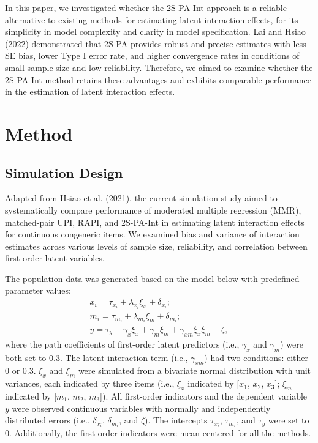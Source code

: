 \documentclass[
  man,mask]{apa6}
\begin{document}
In this paper, we investigated whether the 2S-PA-Int approach is a reliable alternative to existing methods for estimating latent interaction effects, for its simplicity in model complexity and clarity in model specification. Lai and Hsiao (2022) demonstrated that 2S-PA provides robust and precise estimates with less SE bias, lower Type I error rate, and higher convergence rates in conditions of small sample size and low reliability. Therefore, we aimed to examine whether the 2S-PA-Int method retains these advantages and exhibits comparable performance in the estimation of latent interaction effects.

\section{Method}\label{method}

\subsection{Simulation Design}\label{simulation-design}

Adapted from Hsiao et al. (2021), the current simulation study aimed to systematically compare performance of moderated multiple regression (MMR), matched-pair UPI, RAPI, and 2S-PA-Int in estimating latent interaction effects for continuous congeneric items. We examined bias and variance of interaction estimates across various levels of sample size, reliability, and correlation between first-order latent variables.

The population data was generated based on the model below with predefined parameter values:
\begin{equation}
\begin{gathered}
x_{i} =  \tau_{x_{i}} + \lambda_{x_{i}}\xi_{x} + \delta_{x_{i}};\\
m_{i} =  \tau_{m_{i}} + \lambda_{m_{i}}\xi_{m} + \delta_{m_{i}};\\
y =  \tau_{y} + \gamma_{x}\xi_{x} + \gamma_{m}\xi_{m} + \gamma_{xm}\xi_{x}\xi_{m} + \zeta,
\end{gathered}
\end{equation}
where the path coefficients of first-order latent predictors (i.e., \(\gamma_{x}\) and \(\gamma_{m}\)) were both set to 0.3. The latent interaction term (i.e., \(\gamma_{xm}\)) had two conditions: either 0 or 0.3. \(\xi_{x}\) and \(\xi_{m}\) were simulated from a bivariate normal distribution with unit variances, each indicated by three items (i.e., \(\xi_{x}\) indicated by {[}\(x_{1}\), \(x_{2}\), \(x_{3}\){]}; \(\xi_{m}\) indicated by {[}\(m_{1}\), \(m_{2}\), \(m_{3}\){]}). All first-order indicators and the dependent variable \(y\) were observed continuous variables with normally and independently distributed errors (i.e., \(\delta_{x_{i}}\), \(\delta_{m_{i}}\), and \(\zeta\)). The intercepts \(\tau_{x_{i}}\), \(\tau_{m_{i}}\), and \(\tau_{y}\) were set to 0. Additionally, the first-order indicators were mean-centered for all the methods.
\end{document}
